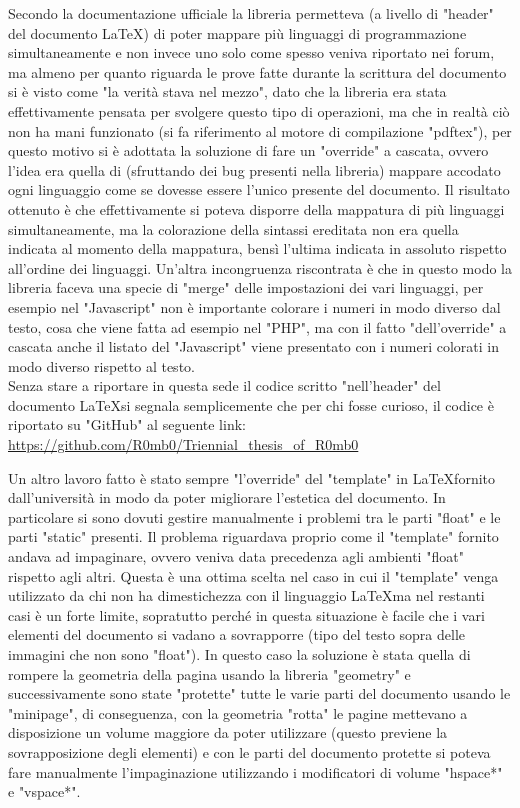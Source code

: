 Secondo la documentazione ufficiale la libreria permetteva (a livello di "header" del documento \LaTeX) di poter mappare più linguaggi di programmazione simultaneamente e non invece uno solo come spesso veniva riportato nei forum, ma almeno per quanto riguarda le prove fatte durante la scrittura del documento si è visto come "la verità stava nel mezzo", dato che la libreria era stata effettivamente pensata per svolgere questo tipo di operazioni, ma che in realtà ciò non ha mani funzionato (si fa riferimento al motore di compilazione "pdftex"), per questo motivo si è adottata la soluzione di fare un "override" a cascata, ovvero l'idea era quella di (sfruttando dei bug presenti nella libreria) mappare accodato ogni linguaggio come se dovesse essere l'unico presente del documento. Il risultato ottenuto è che effettivamente si poteva disporre della mappatura di più linguaggi simultaneamente, ma la colorazione della sintassi ereditata non era quella indicata al momento della mappatura, bensì l'ultima indicata in assoluto rispetto all'ordine dei linguaggi. Un'altra incongruenza riscontrata è che in questo modo la libreria faceva una specie di "merge" delle impostazioni dei vari linguaggi, per esempio nel "Javascript" non è importante colorare i numeri in modo diverso dal testo, cosa che viene fatta ad esempio nel "PHP", ma con il fatto "dell'override" a cascata anche il listato del "Javascript" viene presentato con i numeri colorati in modo diverso rispetto al testo.\\
Senza stare a riportare in questa sede il codice scritto "nell'header" del documento \LaTeX si segnala semplicemente che per chi fosse curioso, il codice è riportato su "GitHub" al seguente link: \url{https://github.com/R0mb0/Triennial_thesis_of_R0mb0}

Un altro lavoro fatto è stato sempre "l'override" del "template" in \LaTeX fornito dall'università in modo da poter migliorare l'estetica del documento. In particolare si sono dovuti gestire manualmente i problemi tra le parti "float" e le parti "static" presenti. Il problema riguardava proprio come il "template" fornito andava ad impaginare, ovvero veniva data precedenza agli ambienti "float" rispetto agli altri. Questa è una ottima scelta nel caso in cui il "template" venga utilizzato da chi non ha dimestichezza con il linguaggio \LaTeX ma nel restanti casi è un forte limite, sopratutto perché in questa situazione è facile che i vari elementi del documento si vadano a sovrapporre  (tipo del testo sopra delle immagini che non sono "float"). In questo caso la soluzione è stata quella di rompere la geometria della pagina usando la libreria "geometry" e successivamente sono state "protette" tutte le varie parti del documento usando le "minipage", di conseguenza, con la geometria "rotta" le pagine mettevano a disposizione un volume maggiore da poter utilizzare (questo previene la sovrapposizione degli elementi) e con le parti del documento protette si poteva fare manualmente l'impaginazione utilizzando i modificatori di volume "hspace*" e "vspace*". 